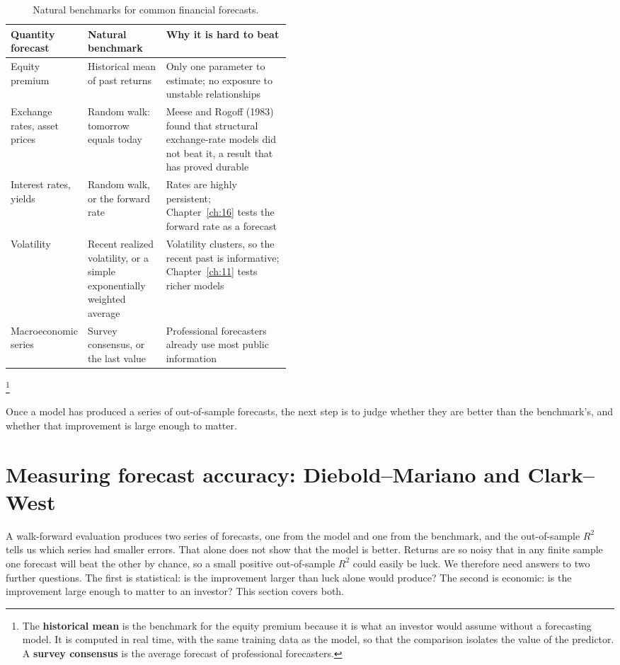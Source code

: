 \begin{table}[htbp]
\centering
\small
\caption{Natural benchmarks for common financial forecasts.}
\label{tab:05-benchmarks}
\begin{tabularx}{0.9\linewidth}{@{}>{\raggedright\arraybackslash}p{0.18\linewidth}>{\raggedright\arraybackslash}p{0.28\linewidth}>{\raggedright\arraybackslash}X@{}}
\toprule
Quantity forecast & Natural benchmark & Why it is hard to beat \\
\midrule
Equity premium & Historical mean of past returns & Only one parameter to estimate; no exposure to unstable relationships \\
Exchange rates, asset prices & Random walk: tomorrow equals today & Meese and Rogoff (1983) found that structural exchange-rate models did not beat it, a result that has proved durable \\
Interest rates, yields & Random walk, or the forward rate & Rates are highly persistent; Chapter~\ref{ch:16} tests the forward rate as a forecast \\
Volatility & Recent realized volatility, or a simple exponentially weighted average & Volatility clusters, so the recent past is informative; Chapter~\ref{ch:11} tests richer models \\
Macroeconomic series & Survey consensus, or the last value & Professional forecasters already use most public information \\
\bottomrule
\end{tabularx}
\end{table}
\footnote{The \textbf{historical mean} is the benchmark for the equity premium because it is what an investor would assume without a forecasting model. It is computed in real time, with the same training data as the model, so that the comparison isolates the value of the predictor. 
A \textbf{survey consensus} is the average forecast of professional forecasters.}

Once a model has produced a series of out-of-sample forecasts, the next step is to judge whether they are better than the benchmark's, and whether that improvement is large enough to matter.

\section{Measuring forecast accuracy: Diebold--Mariano and Clark--West}
\label{sec:05-accuracy}

A walk-forward evaluation produces two series of forecasts, one from the model and one from the benchmark, and the out-of-sample $R^2$ tells us which series had smaller errors. That alone does not show that the model is better. Returns are so noisy that in any finite sample one forecast will beat the other by chance, so a small positive out-of-sample $R^2$ could easily be luck. We therefore need answers to two further questions. The first is statistical: is the improvement larger than luck alone would produce? The second is economic: is the improvement large enough to matter to an investor? This section covers both.

